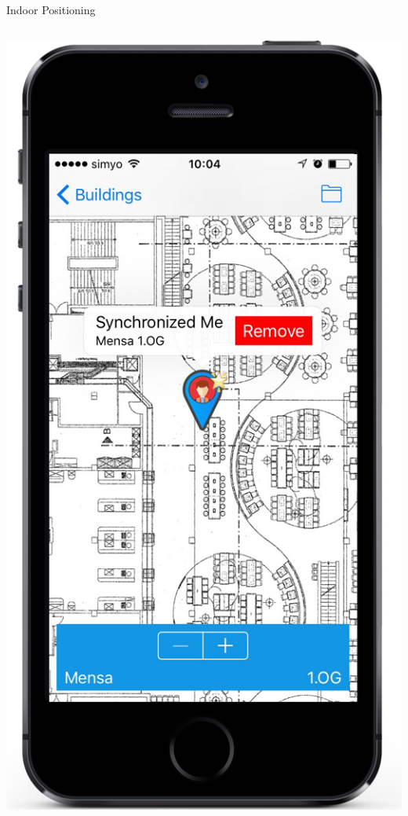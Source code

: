 \documentclass[11pt]{beamer}
\begin{document}
\begin{frame}{Indoor Positioning}
\begin{columns}[T]
\begin{column}{.4\textwidth}
  \includegraphics[scale=0.25]{mappinpointd}
  \end{column}
\end{columns}

\end{frame}
\end{document}
